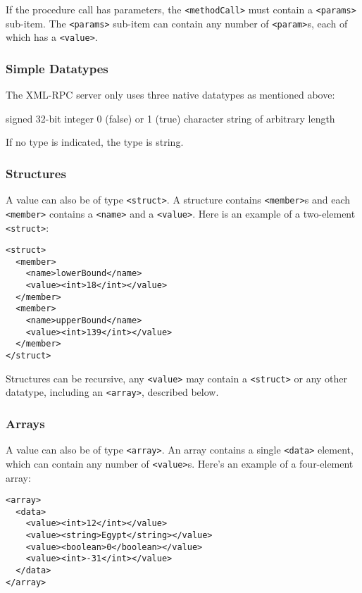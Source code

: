 If the procedure call has parameters, the \verb,<methodCall>, must contain a
\verb,<params>, sub-item. The \verb,<params>, sub-item can contain any
number of \verb,<param>,s, each of which has a \verb,<value>,.


\subsubsection{Simple Datatypes}

The XML-RPC server only uses three native datatypes as mentioned above:

\begin{labeling}{}
 signed 32-bit integer
 0 (false) or 1 (true)
 character string of arbitrary length
\end{labeling}

If no type is indicated, the type is string.


\subsubsection{Structures}

A value can also be of type \verb,<struct>,. A structure contains
\verb,<member>,s and each \verb,<member>, contains a \verb,<name>, and a
\verb,<value>,. Here is an example of a two-element \verb,<struct>,:

\begin{verbatim}
<struct>
  <member>
    <name>lowerBound</name>
    <value><int>18</int></value>
  </member>
  <member>
    <name>upperBound</name>
    <value><int>139</int></value>
  </member>
</struct>
\end{verbatim}

Structures can be recursive, any \verb,<value>, may contain a
\verb,<struct>, or any other datatype, including an \verb,<array>,,
described below.


\subsubsection{Arrays}

A value can also be of type \verb,<array>,. An array contains a single
\verb,<data>, element, which can contain any number of \verb,<value>,s. Here's
an example of a four-element array:

\begin{verbatim}
<array>
  <data>
    <value><int>12</int></value>
    <value><string>Egypt</string></value>
    <value><boolean>0</boolean></value>
    <value><int>-31</int></value>
  </data>
</array>
\end{verbatim}

